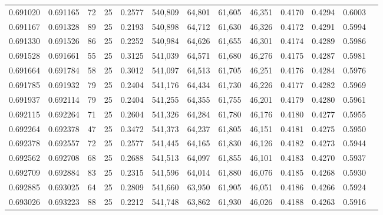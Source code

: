 \begin{tabular}{rrrrrrrrrrrrr}
0.691020 & 0.691165 &    72 &  25 &                                     0.2577 & 540,809 &  64,801 &  61,605 &  46,351 & 0.4170 & 0.4294 & 0.6003 \\
0.691167 & 0.691328 &    89 &  25 &                                     0.2193 & 540,898 &  64,712 &  61,630 &  46,326 & 0.4172 & 0.4291 & 0.5994 \\
0.691330 & 0.691526 &    86 &  25 &                                     0.2252 & 540,984 &  64,626 &  61,655 &  46,301 & 0.4174 & 0.4289 & 0.5986 \\
0.691528 & 0.691661 &    55 &  25 &                                     0.3125 & 541,039 &  64,571 &  61,680 &  46,276 & 0.4175 & 0.4287 & 0.5981 \\
0.691664 & 0.691784 &    58 &  25 &                                     0.3012 & 541,097 &  64,513 &  61,705 &  46,251 & 0.4176 & 0.4284 & 0.5976 \\
0.691785 & 0.691932 &    79 &  25 &                                     0.2404 & 541,176 &  64,434 &  61,730 &  46,226 & 0.4177 & 0.4282 & 0.5969 \\
0.691937 & 0.692114 &    79 &  25 &                                     0.2404 & 541,255 &  64,355 &  61,755 &  46,201 & 0.4179 & 0.4280 & 0.5961 \\
0.692115 & 0.692264 &    71 &  25 &                                     0.2604 & 541,326 &  64,284 &  61,780 &  46,176 & 0.4180 & 0.4277 & 0.5955 \\
0.692264 & 0.692378 &    47 &  25 &                                     0.3472 & 541,373 &  64,237 &  61,805 &  46,151 & 0.4181 & 0.4275 & 0.5950 \\
0.692378 & 0.692557 &    72 &  25 &                                     0.2577 & 541,445 &  64,165 &  61,830 &  46,126 & 0.4182 & 0.4273 & 0.5944 \\
0.692562 & 0.692708 &    68 &  25 &                                     0.2688 & 541,513 &  64,097 &  61,855 &  46,101 & 0.4183 & 0.4270 & 0.5937 \\
0.692709 & 0.692884 &    83 &  25 &                                     0.2315 & 541,596 &  64,014 &  61,880 &  46,076 & 0.4185 & 0.4268 & 0.5930 \\
0.692885 & 0.693025 &    64 &  25 &                                     0.2809 & 541,660 &  63,950 &  61,905 &  46,051 & 0.4186 & 0.4266 & 0.5924 \\
0.693026 & 0.693223 &    88 &  25 &                                     0.2212 & 541,748 &  63,862 &  61,930 &  46,026 & 0.4188 & 0.4263 & 0.5916 \\

\end{tabular}
